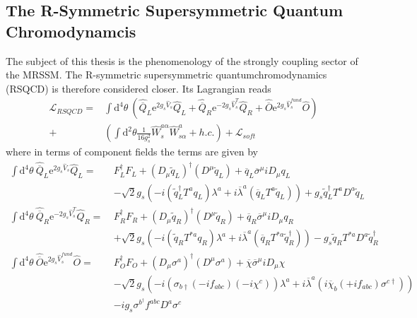 \subsection{The R-Symmetric Supersymmetric Quantum Chromodynamcis}
The subject of this thesis is the phenomenology of the strongly coupling sector of the MRSSM. The R-symmetric supersymmetric quantumchromodynamics (RSQCD) is therefore considered closer. Its Lagrangian reads
\begin{align}
\mathcal{L}_{RSQCD} = &\int\mathrm{d}^4\theta\ \left( \hat{\overline{Q}}_L \mathrm{e}^{2g_s\hat{V}_s} \hat{Q}_L + \hat{\overline{Q}}_R \mathrm{e}^{-2g_s\hat{V}^T_s} \hat{Q}_R + \hat{\overline{O}} \mathrm{e}^{2g_s\hat{V}^{fund}_s} \hat{O}\right)\nonumber\\
+& \left( \int \mathrm{d}^2\theta \frac{1}{16g_s^2} \hat{W}_s^{a\alpha}\hat{W}^a_{s\alpha} + h.c. \right) + \mathcal{L}_{soft}
\end{align}
where in terms of component fields the terms are given by
\begin{align}
\int\mathrm{d}^4\theta\ \hat{\overline{Q}}_L \mathrm{e}^{2g_s\hat{V}_s} \hat{Q}_L =\ & F_L^\dagger F_L + (D_\mu \tilde{q}_L)^\dagger (D^\mu \tilde{q}_L) + \overline{q}_L \overline{\sigma}^\mu i D_\mu q_L\nonumber\\
&-\sqrt{2}g_s \left( -i (\tilde{q}_L^\dagger T^a q_L ) \lambda^a + i \overline{\lambda}^a (\overline{q}_L T^a \tilde{q}_L) \right) + g_s\tilde{q}_L^\dagger T^a D^a \tilde{q}_L\label{eq:RSQCD_Feynmanrules1}\\
\int\mathrm{d}^4\theta\ \hat{\overline{Q}}_R \mathrm{e}^{-2g_s\hat{V}^T_s} \hat{Q}_R =\  & F_R^\dagger F_R + (D_\mu \tilde{q}_R)^\dagger (D^\mu \tilde{q}_R) + \overline{q}_R \overline{\sigma}^\mu i D_\mu q_R\nonumber\\
&+\sqrt{2}g_s \left( -i (\tilde{q}_R T^{\ast a} q_R ) \lambda^a + i \overline{\lambda}^a (\overline{q}_R T^{\ast a} \tilde{q}_R^\dagger) \right) - g_s \tilde{q}_R T^{\ast a} D^a \tilde{q}_R^\dagger\label{eq:RSQCD_Feynmanrules2}\\
\int\mathrm{d}^4\theta\ \hat{\overline{O}} \mathrm{e}^{2g_s\hat{V}^{fund}_s} \hat{O} =\  & F_O^\dagger F_O + (D_\mu \sigma^a)^\dagger (D^\mu \sigma^a) + \overline{\chi} \overline{\sigma}^\mu i D_\mu \chi\nonumber\\
&-\sqrt{2}g_s \left( -i (\sigma_{b\dagger} (-if_{abc}) (-i\chi^c) ) \lambda^a + i \overline{\lambda}^a (i\overline{\chi}_b (+if_{abc}) \sigma^{c\dagger}) \right)\nonumber\\
&-ig_s\sigma^{b^\dagger} f^{abc}D^a\sigma^c
\end{align}
